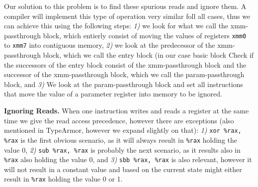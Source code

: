 %

Our solution to this problem is to find these spurious reads and ignore them. A compiler will implement this type of operation very 
similar foll all cases, thus we can achieve this using the following steps:
\textit{1)} we look for what we call the xmm-passthrough block, which entierly consist of moving the values of registers \texttt{xmm0} to 
\texttt{xmm7} into contiguous memory, %
\textit{2)} we look at the predecessor of the xmm-passthrough block, which we call the entry block (in our case basic block %
Check if the successors of the entry block consist of the xmm-passthrough block and the successor of the 
xmm-passthrough block, which we call the param-passthrough block, and
\textit{3)} We look at the param-passthrough block and set all instructions that move the value of a parameter register into memory to be
ignored. %

\textbf{Ignoring Reads.} When one instruction writes and reads a register at the same time we give the read access precedence, however there are exceptions (also mentioned in TypeArmor, however we expand slightly on that):
\textit{1)} \texttt{xor \%rax, \%rax} is the first obvious scenario, as it will always result in \texttt{\%rax} holding the value 0,
\textit{2)} \texttt{sub \%rax, \%rax} is probably the next scenario, as it results also in \texttt{\%rax} also holding the value 0, and
\textit{3)} \texttt{sbb \%rax, \%rax} is also relevant, however it will not result in a constant value and based on the current state might either result in \texttt{\%rax} holding the value 0 or 1.

